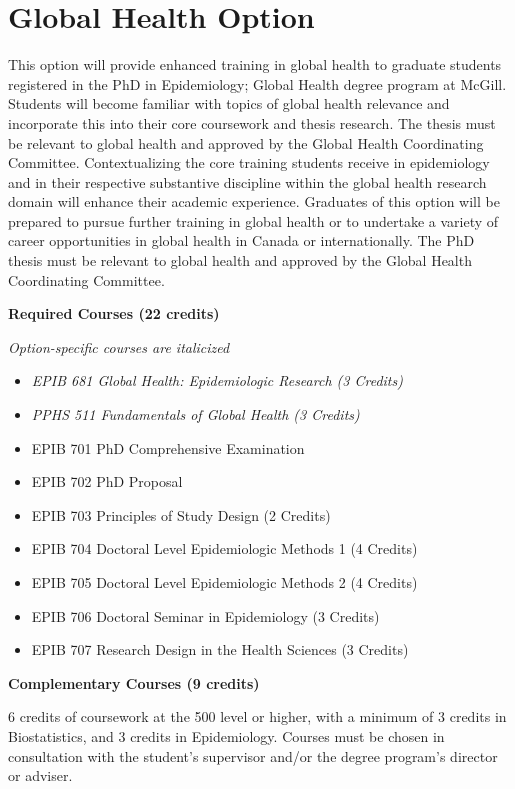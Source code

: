 \documentclass[
  openany]{book}
\providecommand{\tightlist}{%
  \setlength{\itemsep}{0pt}\setlength{\parskip}{0pt}}
\begin{document}
\hypertarget{global-health-option}{%
\section{Global Health Option}\label{global-health-option}}

This option will provide enhanced training in global health to graduate students registered in the PhD in Epidemiology; Global Health degree program at McGill. Students will become familiar with topics of global health relevance and incorporate this into their core coursework and thesis research. The thesis must be relevant to global health and approved by the Global Health Coordinating Committee. Contextualizing the core training students receive in epidemiology and in their respective substantive discipline within the global health research domain will enhance their academic experience. Graduates of this option will be prepared to pursue further training in global health or to undertake a variety of career opportunities in global health in Canada or internationally. The PhD thesis must be relevant to global health and approved by the Global Health Coordinating Committee.

\textbf{Required Courses (22 credits)}

\emph{Option-specific courses are italicized}

\begin{itemize}
\tightlist
\item
  \emph{EPIB 681 Global Health: Epidemiologic Research (3 Credits)}
\item
  \emph{PPHS 511 Fundamentals of Global Health (3 Credits)}
\item
  EPIB 701 PhD Comprehensive Examination
\item
  EPIB 702 PhD Proposal
\item
  EPIB 703 Principles of Study Design (2 Credits)
\item
  EPIB 704 Doctoral Level Epidemiologic Methods 1 (4 Credits)
\item
  EPIB 705 Doctoral Level Epidemiologic Methods 2 (4 Credits)
\item
  EPIB 706 Doctoral Seminar in Epidemiology (3 Credits)
\item
  EPIB 707 Research Design in the Health Sciences (3 Credits)
\end{itemize}

\textbf{Complementary Courses (9 credits)}

6 credits of coursework at the 500 level or higher, with a minimum of 3 credits in Biostatistics, and 3 credits in Epidemiology. Courses must be chosen in consultation with the student's supervisor and/or the degree program's director or adviser.
\end{document}

